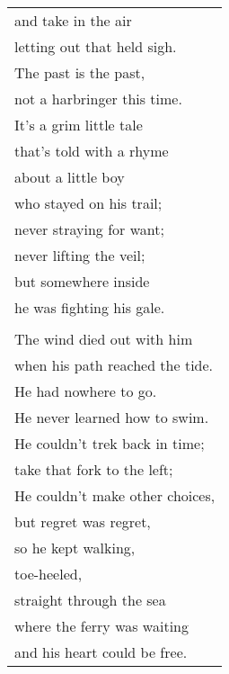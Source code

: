 \documentclass{article}
\begin{document}
\begin{center}
\begin{tabular}{l}
and take in the air \\
letting out that held sigh. \\
The past is the past, \\
not a harbringer this time. \\
It's a grim little tale \\
that's told with a rhyme \\
about a little boy \\
who stayed on his trail; \\
never straying for want; \\
never lifting the veil; \\
but somewhere inside \\
he was fighting his gale. \\
\\
The wind died out with him \\
when his path reached the tide. \\
He had nowhere to go. \\
He never learned how to swim. \\
He couldn't trek back in time; \\
take that fork to the left; \\
He couldn't make other choices, \\
but regret was regret, \\
so he kept walking, \\
toe-heeled, \\
straight through the sea \\
where the ferry was waiting \\
and his heart could be free.
\end{tabular}
\end{center}
\end{document}
